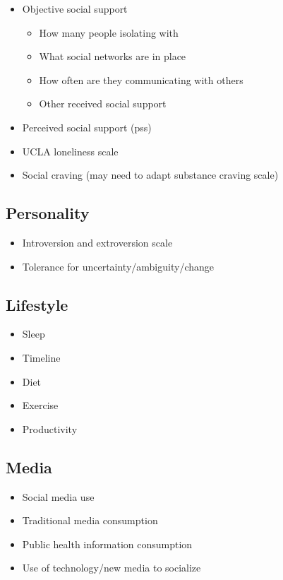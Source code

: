 \documentclass[]{book}
\providecommand{\tightlist}{%
  \setlength{\itemsep}{0pt}\setlength{\parskip}{0pt}}
\begin{document}
\begin{itemize}
\tightlist
\item
  Objective social support

  \begin{itemize}
  \tightlist
  \item
    How many people isolating with
  \item
    What social networks are in place
  \item
    How often are they communicating with others
  \item
    Other received social support
  \end{itemize}
\item
  Perceived social support (pss)
\item
  UCLA loneliness scale
\item
  Social craving (may need to adapt substance craving scale)
\end{itemize}

\hypertarget{personality}{%
\subsection{Personality}\label{personality}}

\begin{itemize}
\tightlist
\item
  Introversion and extroversion scale
\item
  Tolerance for uncertainty/ambiguity/change
\end{itemize}

\hypertarget{lifestyle}{%
\subsection{Lifestyle}\label{lifestyle}}

\begin{itemize}
\tightlist
\item
  Sleep
\item
  Timeline
\item
  Diet
\item
  Exercise
\item
  Productivity
\end{itemize}

\hypertarget{media}{%
\subsection{Media}\label{media}}

\begin{itemize}
\tightlist
\item
  Social media use
\item
  Traditional media consumption
\item
  Public health information consumption
\item
  Use of technology/new media to socialize
\end{itemize}
\end{document}
